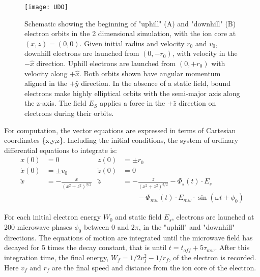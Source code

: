 \documentclass[aps,pra,preprint,groupedaddress]{revtex4-1}
\begin{document}
\begin{figure}
	\texttt{[image: UDO]}
	\caption{Schematic showing the beginning of "uphill" (A) and "downhill" (B) electron orbits in the 2 dimensional simulation, with the ion core at $(x, z) = (0, 0)$. Given initial radius and velocity $r_0$ and $v_0$, downhill electrons are launched from $(0, -r_0)$, with velocity in the $-\hat{x}$ direction. Uphill electrons are launched from $(0, +r_0)$ with velocity along $+\hat{x}$. Both orbits shown have angular momentum aligned in the $+\hat{y}$ direction. In the absence of a static field, bound electrons make highly elliptical orbits with the semi-major axis along the z-axis. The field $E_S$ applies a force in the $+\hat{z}$ direction on electrons during their orbits.}
	\label{fig:udo}
\end{figure}

For computation, the vector equations are expressed in terms of Cartesian coordinates \{x,y,z\}. Including the initial conditions, the system of ordinary differential equations to integrate is:
\begin{align*}
x(0) & = 0 & z(0) & = \pm r_0 \\
\dot{x}(0) & = \pm v_0 & \dot{z}(0) & = 0 \\
\ddot{x} & = -\frac{x}{(x^2 + z^2)^{3/2}} & \ddot{z} & = -\frac{z}{(x^2 + z^2)^{3/2}} - \Phi_s(t) \cdot E_s \\
 & & & \quad \quad - \Phi_{mw}(t) \cdot E_{mw} \cdot \sin{(\omega t + \phi_0)}
\end{align*}

For each initial electron energy $W_0$ and static field $E_s$, electrons are launched at 200 microwave phases $\phi_0$ between 0 and $2\pi$, in the "uphill" and "downhill" directions. The equations of motion are integrated until the microwave field has decayed for 5 times the decay constant, that is until  $t=t_{off} + 5\tau_{mw}$. After this integration time, the final energy, $W_f = 1/2 v_f^2 - 1/r_f$, of the electron is recorded. Here $v_f$ and $r_f$ are the final speed and distance from the ion core of the electron.
\end{document}
